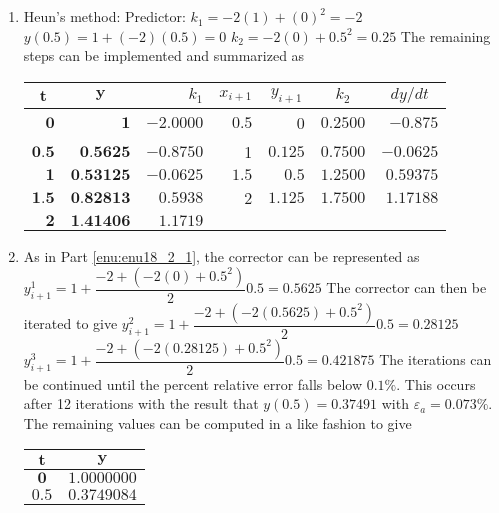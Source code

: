 \documentclass[../main.tex]{subfiles}
\begin{document}
\section{}
\begin{enumerate}[label=\bfseries(\alph*)]
\item\label{enu:enu18_2_1} Heun's method:
	\bigbreak
Predictor:
	\bigbreak
$k_{1}=-2(1)+(0)^{2}=-2$
	\bigbreak
$y(0.5)=1+(-2)(0.5)=0$
	\bigbreak
$k_{2}=-2(0)+0.5^{2}=0.25$
	\bigbreak
The remaining steps can be implemented and summarized as
	\bigbreak
\begin{tabular}{|r|r|r|r|r|r|r|}
\hline
\multicolumn{1}{|c|}{$\boldsymbol{t}$} & \multicolumn{1}{c|}{$\boldsymbol{y}$} & $k_{1}$ & $x_{i+1}$ & \multicolumn{1}{c|}{$y_{i+1}$} & \multicolumn{1}{|c|}{$k_{2}$} & \multicolumn{1}{c|}{$d y / d t$} \\
\hline
$\mathbf{0}$ & $\mathbf{1}$ & $-2.0000$ & $0.5$ & 0 & $0.2500$ & $-0.875$ \\
\hline
$\mathbf{0 . 5}$ & $\mathbf{0 . 5 6 2 5}$ & $-0.8750$ & 1 & $0.125$ & $0.7500$ & $-0.0625$ \\
\hline
$\mathbf{1}$ & $\mathbf{0 . 5 3 1 2 5}$ & $-0.0625$ & $1.5$ & $0.5$ & $1.2500$ & $0.59375$ \\
\hline
$\mathbf{1 . 5}$ & $\mathbf{0 . 8 2 8 1 3}$ & $0.5938$ & 2 & $1.125$ & $1.7500$ & $1.17188$ \\
\hline
$\mathbf{2}$ & $\mathbf{1 . 4 1 4 0 6}$ & $1.1719$ &  &  &  &  \\
\hline
\end{tabular}
	\bigbreak
\item As in Part \ref{enu:enu18_2_1}, the corrector can be represented as
	\bigbreak
$y_{i+1}^{1}=1+\dfrac{-2+\left(-2(0)+0.5^{2}\right)}{2} 0.5=0.5625$
	\bigbreak
The corrector can then be iterated to give
	\bigbreak
$y_{i+1}^{2}=1+\dfrac{-2+\left(-2(0.5625)+0.5^{2}\right)}{2} 0.5=0.28125$
	\bigbreak
$y_{i+1}^{3}=1+\dfrac{-2+\left(-2(0.28125)+0.5^{2}\right)}{2} 0.5=0.421875$
	\bigbreak
The iterations can be continued until the percent relative error falls below $0.1 \%$. This occurs after 12 iterations with the result that $y(0.5)=0.37491$ with $\varepsilon_{a}=0.073 \%$. The remaining values can be computed in a like fashion to give
	\bigbreak
\begin{tabular}{cc}
\hline
$\boldsymbol{t}$&$\boldsymbol{y}$\\
\hline
$\mathbf{0}$&$\mathbf{1.0000000}$\\
$\mathbf{0.5}$&$\mathbf{0.3749084}$\\

\end{tabular}
\end{enumerate}
\end{document}

